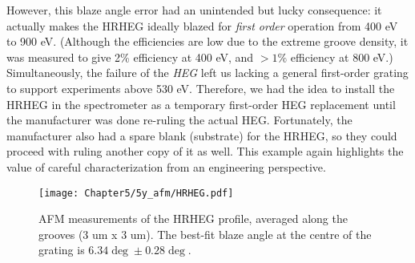 However, this blaze angle error had an unintended but lucky consequence: it actually makes the HRHEG ideally blazed for \emph{first order} operation from 400 eV to 900 eV.  (Although the efficiencies are low due to the extreme groove density, it was measured to give 2\% efficiency at 400 eV, and $>1\%$ efficiency at 800 eV.)  Simultaneously, the failure of the \emph{HEG} left us lacking a general first-order grating to support experiments above 530 eV.  Therefore, we had the idea to install the HRHEG in the spectrometer as a temporary first-order HEG replacement until the manufacturer was done re-ruling the actual HEG.  Fortunately, the manufacturer also had a spare blank (substrate) for the HRHEG, so they could proceed with ruling another copy of it as well.  This example again highlights the value of careful characterization from an engineering perspective.

\begin{figure}[htbp] %
   \centering
   \texttt{[image: Chapter5/5y\_afm/HRHEG.pdf]} 
   \caption{AFM measurements of the HRHEG profile, averaged along the grooves (3 um x 3 um).  The best-fit blaze angle at the centre of the grating is $6.34\deg \pm 0.28\deg$.}
   \label{5y-hrheg}
\end{figure}
